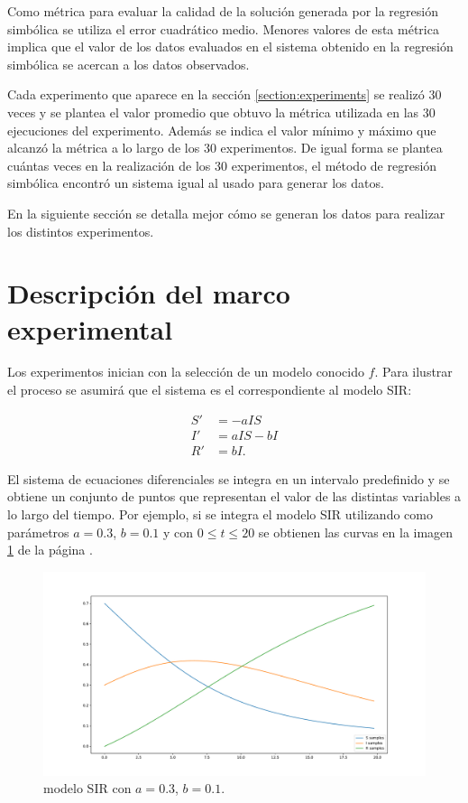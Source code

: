 Como métrica para evaluar la calidad de la solución generada por la regresión simbólica se utiliza el error cuadrático medio. Menores valores de esta métrica implica que el valor de los datos evaluados en el sistema obtenido en la regresión simbólica se acercan a los datos observados.

Cada experimento que aparece en la sección \ref{section:experiments} se realizó 30 veces y se plantea el valor promedio que obtuvo la métrica utilizada en las 30 ejecuciones del experimento. Además se indica el valor mínimo y máximo que alcanzó la métrica a lo largo de los 30 experimentos. De igual forma se plantea cuántas veces en la realización de los 30 experimentos, el método de regresión simbólica encontró un sistema igual al usado para generar los datos.

En la siguiente sección se detalla mejor cómo se generan los datos para realizar los distintos experimentos.

\section{Descripción del marco experimental}\label{section:experimental_frame}

Los experimentos inician con la selección de un modelo conocido $f$. Para ilustrar el proceso se asumirá que el sistema es el correspondiente al modelo SIR:

\begin{align*}
    S' & = - aIS    \\
    I' & = aIS - bI \\
    R' & = bI.
\end{align*}

El sistema de ecuaciones diferenciales se integra en un intervalo predefinido y se obtiene un conjunto de puntos que representan el valor de las distintas variables a lo largo del tiempo. Por ejemplo, si se integra el modelo SIR utilizando como parámetros $a = 0.3$, $b = 0.1$ y con $0 \leq t \leq 20$ se obtienen las curvas en la imagen \ref{fig:SIR} de la página \pageref{fig:SIR}.

\begin{figure}[h]
    \centering
    \includegraphics[width=\textwidth]{"figures/SIR.pdf"}
    \caption{modelo SIR con $a = 0.3$, $b = 0.1$.}
    \label{fig:SIR}
\end{figure}

